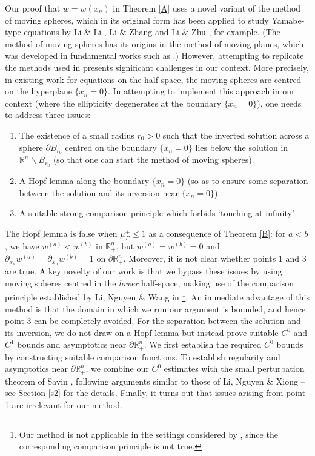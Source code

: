 \documentclass[12pt]{article}
\numberwithin{equation}{section}
\theoremstyle{plain}
\theoremstyle{definition}
\begin{document}
Our proof that $w=w(x_n)$ in Theorem \ref{A} uses a novel variant of the method of moving spheres, which in its original form has been applied to study Yamabe-type equations by Li \& Li \cite{LL05, LL06}, Li \& Zhang \cite{LZ03} and Li \& Zhu \cite{LZ95}, for example. (The method of moving spheres has its origins in the method of moving planes, which was developed in fundamental works such as \cite{Ser71, BN91, GNN79, GNN81, A58}.) However, attempting to replicate the methods used in \cite{LZ95, LZ03, LL05, LL06} presents significant challenges in our context. More precisely, in existing work for equations on the half-space, the moving spheres are centred on the hyperplane $\{x_n=0\}$. In attempting to implement this approach in our context (where the ellipticity degenerates at the boundary $\{x_n=0\}$), one needs to address three issues: \smallskip
\begin{enumerate}
	\item The existence of a small radius $r_0>0$ such that the inverted solution across a sphere $\partial B_{r_0}$ centred on the boundary $\{x_n=0\}$ lies below the solution in $\mathbb{R}_+^n\backslash B_{r_0}$ (so that one can start the method of moving spheres).\smallskip
	\item A Hopf lemma along the boundary $\{x_n=0\}$ (so as to ensure some separation between the solution and its inversion near $\{x_n=0\}$). \smallskip
	\item A suitable strong comparison principle which forbids `touching at infinity'. 
\end{enumerate} 
The Hopf lemma is false when $\mu_\Gamma^+ \leq 1$ as a consequence of Theorem \ref{B}: for $a<b$, we have $w^{(a)}<w^{(b)}$ in $\mathbb{R}_+^n$, but $w^{(a)} = w^{(b)}=0$ and $\partial_{x_n} w^{(a)}= \partial_{x_n}w^{(b)} =1$ on $\partial\mathbb{R}_+^n$. Moreover, it is not clear whether points 1 and 3 are true. A key novelty of our work is that we bypass these issues by using moving spheres centred in the \textit{lower} half-space, making use of the comparison principle established by Li, Nguyen \& Wang in \cite{LNW18}\footnote{Our method is not applicable in the settings considered by \cite{LL05, LL06, LZ03, LZ95}, since the corresponding comparison principle is not true.}. An immediate advantage of this method is that the domain in which we run our argument is bounded, and hence point 3 can be completely avoided. For the separation between the solution and its inversion, we do not draw on a Hopf lemma but instead prove suitable $C^0$ and $C^1$ bounds and asymptotics near $\partial\mathbb{R}_+^n$. We first establish the required $C^0$ bounds by constructing suitable comparison functions. To establish regularity and asymptotics near $\partial\mathbb{R}_+^n$, we combine our $C^0$ estimates with the small perturbation theorem of Savin \cite{Sav07}, following arguments similar to those of Li, Nguyen \& Xiong \cite{LNX22} -- see Section \ref{s2} for the details. Finally, it turns out that issues arising from point 1 are irrelevant for our method.\medskip 
\end{document}
